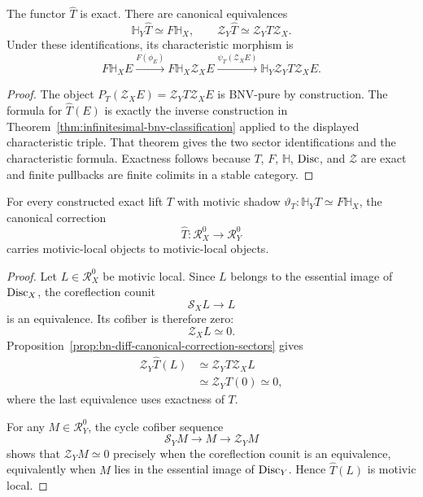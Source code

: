 \begin{proposition}
\label{prop:bn-diff-canonical-correction-sectors}
The functor \(\widehat T\) is exact.  There are canonical equivalences
\[
  \boxed{
  \mathbb H_Y\widehat T
  \simeq
  F\mathbb H_X,
  \qquad
  \mathcal Z_Y\widehat T
  \simeq
  \mathcal Z_YT\mathcal Z_X.
  }
\]
Under these identifications, its characteristic morphism is
\[
  F\mathbb H_XE
  \xrightarrow{F(\phi_E)}
  F\mathbb H_X\mathcal Z_XE
  \xrightarrow{\psi_T(\mathcal Z_XE)}
  \mathbb H_Y\mathcal Z_YT\mathcal Z_XE.
\]
\end{proposition}

\begin{proof}
The object \(P_T(\mathcal Z_XE)=\mathcal Z_YT\mathcal Z_XE\) is BNV-pure by
construction.  The formula for \(\widehat T(E)\) is exactly the inverse
construction in Theorem~\ref{thm:infinitesimal-bnv-classification} applied to
the displayed characteristic triple.  That theorem gives the two sector
identifications and the characteristic formula.  Exactness follows because
\(T\), \(F\), \(\mathbb H\), \(\operatorname{Disc}\), and \(\mathcal Z\) are exact and finite
pullbacks are finite colimits in a stable category.
\end{proof}

\begin{proposition}
\label{prop:bn-diff-canonical-correction-local}
For every constructed exact lift \(T\) with motivic shadow
\(\vartheta_T:\mathbb H_YT\simeq F\mathbb H_X\), the canonical correction
\[
  \widehat T:\mathcal R_X^0\longrightarrow\mathcal R_Y^0
\]
carries motivic-local objects to motivic-local objects.
\end{proposition}

\begin{proof}
Let \(L\in\mathcal R_X^0\) be motivic local.  Since \(L\) belongs to the
essential image of \(\operatorname{Disc}_X\), the coreflection counit
\[
  \mathcal S_XL\longrightarrow L
\]
is an equivalence.  Its cofiber is therefore zero:
\[
  \mathcal Z_XL\simeq0.
\]
Proposition~\ref{prop:bn-diff-canonical-correction-sectors} gives
\[
\begin{aligned}
  \mathcal Z_Y\widehat T(L)
  &\simeq
  \mathcal Z_YT\mathcal Z_XL\\
  &\simeq
  \mathcal Z_YT(0)
  \simeq0,
\end{aligned}
\]
where the last equivalence uses exactness of \(T\).

For any \(M\in\mathcal R_Y^0\), the cycle cofiber sequence
\[
  \mathcal S_YM\longrightarrow M\longrightarrow\mathcal Z_YM
\]
shows that \(\mathcal Z_YM\simeq0\) precisely when the coreflection counit is
an equivalence, equivalently when \(M\) lies in the essential image of
\(\operatorname{Disc}_Y\).  Hence \(\widehat T(L)\) is motivic local.
\end{proof}

